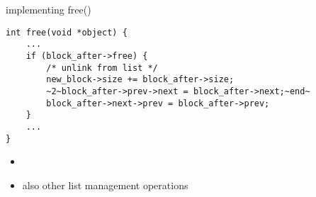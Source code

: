 \begin{frame}[fragile,label=freeImpl]{implementing free()}
\begin{lstlisting}
int free(void *object) {
    ...
    if (block_after->free) {
        /* unlink from list */
        new_block->size += block_after->size;
        ~2~block_after->prev->next = block_after->next;~end~
        block_after->next->prev = block_after->prev;
    }
    ...
}
\end{lstlisting}
\begin{itemize}
\item<2> \large {}
\item<2> also other list management operations
\end{itemize}
\end{frame}

